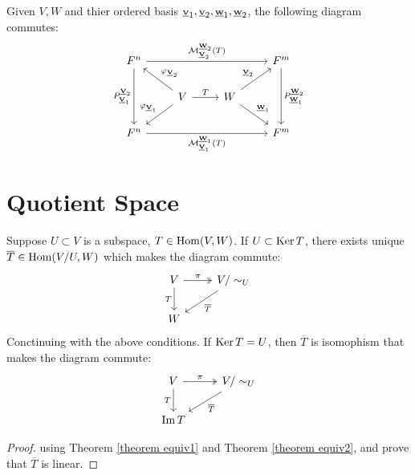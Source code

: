 \begin{theorem}
    Given $V, W$ and thier ordered basis $\bs{V}{1}, \bs{V}{2}, \bs{W}{1}, \bs{W}{2}$, the following diagram commutes:
    \[
        \begin{tikzcd}
            F^n \arrow[rrr, "\calM^{\bs{W}{2}}_{\bs{V}{2}}(T)"] \arrow[dd, "P^{\bs{V}{2}}_{\bs{V}{1}}"']
            &
            &
            & F^m \arrow[dd, "P^{\bs{W}{2}}_{\bs{W}{1}}"]
            \\
            & V \arrow[r, "T"] \arrow[lu, "\varphi_{\bs{V}{2}}"'] \arrow[ld, "\varphi_{\bs{V}{1}}"']
            & W \arrow[ru, "\bs{V}{2}"]  \arrow[rd, "\bs{W}{1}"]
            &
            \\
            F^n \arrow[rrr, "\calM^{\bs{W}{1}}_{\bs{V}{1}}(T)"']
            &
            &
            & F^m
        \end{tikzcd}
    \]
\end{theorem}









\section{Quotient Space}
\begin{theorem}
    \label{theorem linear0}
    Suppose $U \subset V$ is a subspace, $T \in \operatorname{Hom}(V, W)$. If $U \subset \operatorname{Ker} T $, there exists unique $\overline{T} \in \operatorname{Hom}(V / U, W)$ which makes the diagram commute:
    \[
        \begin{tikzcd}
            V \arrow[two heads, r, "\pi"] \arrow[d, "T"']
            & V / \sim_U \arrow[ld, "\overline{T}"]
            \\
            W
        \end{tikzcd}
    \]
    Conctinuing with the above conditions. If $\operatorname{Ker} T = U$, then $\overline{T}$ is isomophism that makes the diagram commute:
    \[
        \begin{tikzcd}
            V \arrow[two heads, r, "\pi"] \arrow[d, "T"']
            & V / \sim_U \arrow[ld, "\overline{T}"]
            \\
            \Im T
        \end{tikzcd}
    \]
\end{theorem}


\begin{proof}
    using Theorem \ref{theorem equiv1} and Theorem \ref{theorem equiv2}, and prove that $\overline{T}$ is linear.
\end{proof}








